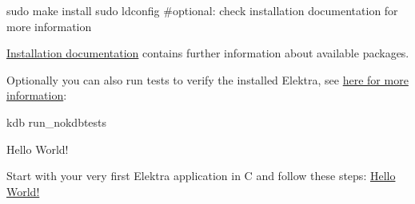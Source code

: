 \begin{DoxyCode}
sudo make install
sudo ldconfig #optional: check installation documentation for more information
\end{DoxyCode}


\hyperlink{doc_INSTALL_md}{Installation documentation} contains further information about available packages.

Optionally you can also run tests to verify the installed Elektra, see \hyperlink{doc_TESTING_md}{here for more information}\+:


\begin{DoxyCode}
kdb run\_nokdbtests
\end{DoxyCode}



\begin{DoxyItemize}
\item Hello World!

Start with your very first Elektra application in C and follow these steps\+: \hyperlink{doc_tutorials_hello-elektra_md}{Hello World!} 
\end{DoxyItemize}